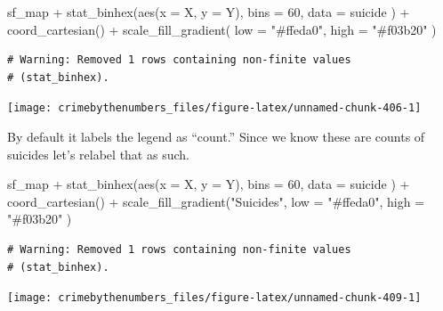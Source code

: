 \documentclass[
]{krantz}
\makeatletter
\newenvironment{Shaded}{\begin{snugshade}}{\end{snugshade}}
\newcommand{\AttributeTok}[1]{\textcolor[rgb]{0.61,0.61,0.61}{#1}}
\newcommand{\DecValTok}[1]{\textcolor[rgb]{0.06,0.06,0.06}{#1}}
\newcommand{\FunctionTok}[1]{\textcolor[rgb]{0,0,0}{#1}}
\newcommand{\NormalTok}[1]{#1}
\newcommand{\SpecialCharTok}[1]{\textcolor[rgb]{0,0,0}{#1}}
\newcommand{\StringTok}[1]{\textcolor[rgb]{0.5,0.5,0.5}{#1}}
\newenvironment{kframe}{%
\medskip{}
\setlength{\fboxsep}{.8em}
 \def\at@end@of@kframe{}%
 \ifinner\ifhmode%
  \def\at@end@of@kframe{\end{minipage}}%
  \begin{minipage}{\columnwidth}%
 \fi\fi%
 \def\FrameCommand##1{\hskip\@totalleftmargin \hskip-\fboxsep
 \colorbox{shadecolor}{##1}\hskip-\fboxsep
     \hskip-\linewidth \hskip-\@totalleftmargin \hskip\columnwidth}%
 \MakeFramed {\advance\hsize-\width
   \@totalleftmargin\z@ \linewidth\hsize
   \@setminipage}}%
 {\par\unskip\endMakeFramed%
 \at@end@of@kframe}
\renewenvironment{Shaded}{\begin{kframe}}{\end{kframe}}
\makeatother
\begin{document}
\begin{Shaded}
\begin{Highlighting}[]
\NormalTok{sf\_map }\SpecialCharTok{+}
  \FunctionTok{stat\_binhex}\NormalTok{(}\FunctionTok{aes}\NormalTok{(}\AttributeTok{x =}\NormalTok{ X, }\AttributeTok{y =}\NormalTok{ Y),}
    \AttributeTok{bins =} \DecValTok{60}\NormalTok{,}
    \AttributeTok{data =}\NormalTok{ suicide}
\NormalTok{  ) }\SpecialCharTok{+}
  \FunctionTok{coord\_cartesian}\NormalTok{() }\SpecialCharTok{+}
  \FunctionTok{scale\_fill\_gradient}\NormalTok{(}
    \AttributeTok{low =} \StringTok{"\#ffeda0"}\NormalTok{,}
    \AttributeTok{high =} \StringTok{"\#f03b20"}
\NormalTok{  )}
\end{Highlighting}
\end{Shaded}

\begin{verbatim}
# Warning: Removed 1 rows containing non-finite values
# (stat_binhex).
\end{verbatim}

\begin{center}\texttt{[image: crimebythenumbers\_files/figure-latex/unnamed-chunk-406-1]} \end{center}

By default it labels the legend as ``count.'' Since we know
these are counts of suicides let's relabel that as such.

\begin{Shaded}
\begin{Highlighting}[]
\NormalTok{sf\_map }\SpecialCharTok{+}
  \FunctionTok{stat\_binhex}\NormalTok{(}\FunctionTok{aes}\NormalTok{(}\AttributeTok{x =}\NormalTok{ X, }\AttributeTok{y =}\NormalTok{ Y),}
    \AttributeTok{bins =} \DecValTok{60}\NormalTok{,}
    \AttributeTok{data =}\NormalTok{ suicide}
\NormalTok{  ) }\SpecialCharTok{+}
  \FunctionTok{coord\_cartesian}\NormalTok{() }\SpecialCharTok{+}
  \FunctionTok{scale\_fill\_gradient}\NormalTok{(}\StringTok{"Suicides"}\NormalTok{,}
    \AttributeTok{low =} \StringTok{"\#ffeda0"}\NormalTok{,}
    \AttributeTok{high =} \StringTok{"\#f03b20"}
\NormalTok{  )}
\end{Highlighting}
\end{Shaded}

\begin{verbatim}
# Warning: Removed 1 rows containing non-finite values
# (stat_binhex).
\end{verbatim}

\begin{center}\texttt{[image: crimebythenumbers\_files/figure-latex/unnamed-chunk-409-1]} \end{center}
\end{document}
